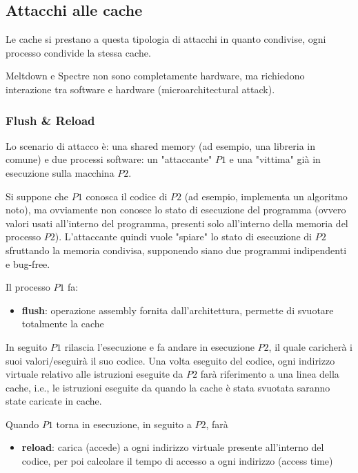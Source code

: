 \subsection{Attacchi alle cache}

Le cache si prestano a questa tipologia di attacchi in quanto condivise, ogni processo condivide la stessa cache. 

Meltdown e Spectre non sono completamente hardware, ma richiedono interazione tra software e hardware (microarchitectural attack).

\subsubsection{Flush \& Reload}

Lo scenario di attacco è: una shared memory (ad esempio, una libreria in comune) e due processi software: un "attaccante" $P1$ e una "vittima" già in esecuzione sulla macchina $P2$. 

Si suppone che $P1$ conosca il codice di $P2$ (ad esempio, implementa un algoritmo noto), ma ovviamente non conosce lo stato di esecuzione del programma (ovvero valori usati all'interno del programma, presenti solo all'interno della memoria del processo $P2$). L'attaccante quindi vuole "spiare" lo stato di esecuzione di $P2$ sfruttando la memoria condivisa, supponendo siano due programmi indipendenti e bug-free.

Il processo $P1$ fa: 
\begin{itemize}
	\item \textbf{flush}: operazione assembly fornita dall'architettura, permette di svuotare totalmente la cache
\end{itemize}

In seguito $P1$ rilascia l'esecuzione e fa andare in esecuzione $P2$, il quale caricherà i suoi valori/eseguirà il suo codice. Una volta eseguito del codice, ogni indirizzo virtuale relativo alle istruzioni eseguite da $P2$ farà riferimento a una linea della cache, i.e., le istruzioni eseguite da quando la cache è stata svuotata saranno state caricate in cache.

Quando $P1$ torna in esecuzione, in seguito a $P2$, farà
\begin{itemize}
	\item \textbf{reload}: carica (accede) a ogni indirizzo virtuale presente all'interno del codice, per poi calcolare il tempo di accesso a ogni indirizzo (access time)
\end{itemize}

